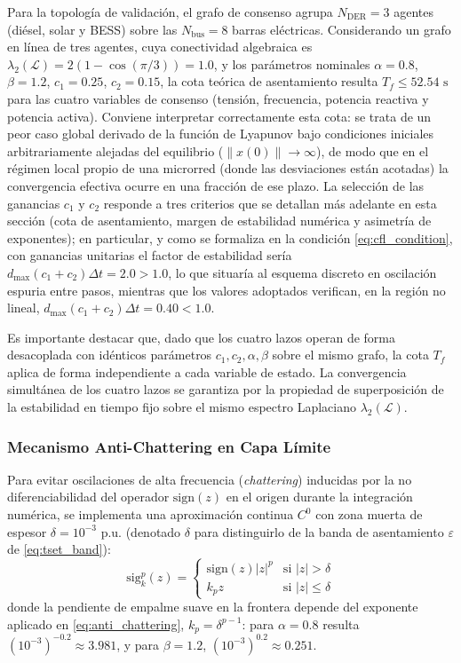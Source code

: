 Para la topología de validación, el grafo de consenso agrupa $N_{\text{DER}} = 3$ agentes (diésel, solar y BESS) sobre las $N_{\text{bus}} = 8$ barras eléctricas. Considerando un grafo en línea de tres agentes, cuya conectividad algebraica es $\lambda_2(\mathcal{L}) = 2(1-\cos(\pi/3)) = 1.0$, y los parámetros nominales $\alpha = 0.8$, $\beta = 1.2$, $c_1 = 0.25$, $c_2 = 0.15$, la cota teórica de asentamiento resulta $T_f \le 52.54\text{ s}$ para las cuatro variables de consenso (tensión, frecuencia, potencia reactiva y potencia activa). Conviene interpretar correctamente esta cota: se trata de un peor caso global derivado de la función de Lyapunov bajo condiciones iniciales arbitrariamente alejadas del equilibrio ($\|x(0)\| \to \infty$), de modo que en el régimen local propio de una microrred (donde las desviaciones están acotadas) la convergencia efectiva ocurre en una fracción de ese plazo. La selección de las ganancias $c_1$ y $c_2$ responde a tres criterios que se detallan más adelante en esta sección (cota de asentamiento, margen de estabilidad numérica y asimetría de exponentes); en particular, y como se formaliza en la condición \eqref{eq:cfl_condition}, con ganancias unitarias el factor de estabilidad sería $d_{\max}(c_1+c_2)\Delta t = 2.0 > 1.0$, lo que situaría al esquema discreto en oscilación espuria entre pasos, mientras que los valores adoptados verifican, en la región no lineal, $d_{\max}(c_1+c_2)\Delta t = 0.40 < 1.0$.

Es importante destacar que, dado que los cuatro lazos operan de forma desacoplada con idénticos parámetros $c_1, c_2, \alpha, \beta$ sobre el mismo grafo, la cota $T_f$ aplica de forma independiente a cada variable de estado. La convergencia simultánea de los cuatro lazos se garantiza por la propiedad de superposición de la estabilidad en tiempo fijo sobre el mismo espectro Laplaciano $\lambda_2(\mathcal{L})$.

\subsubsection{Mecanismo Anti-Chattering en Capa Límite}
Para evitar oscilaciones de alta frecuencia (\textit{chattering}) inducidas por la no diferenciabilidad del operador $\text{sign}(z)$ en el origen durante la integración numérica, se implementa una aproximación continua $C^0$ con zona muerta de espesor $\delta = 10^{-3}\text{ p.u.}$ (denotado $\delta$ para distinguirlo de la banda de asentamiento $\varepsilon$ de \eqref{eq:tset_band}):
\begin{equation}\label{eq:anti_chattering}
\text{sig}_k^p(z) = \begin{cases} \text{sign}(z)|z|^p & \text{si } |z| > \delta \\ k_p z & \text{si } |z| \le \delta \end{cases}
\end{equation}
donde la pendiente de empalme suave en la frontera depende del exponente aplicado en \eqref{eq:anti_chattering}, $k_p = \delta^{p-1}$: para $\alpha = 0.8$ resulta $(10^{-3})^{-0.2} \approx 3.981$, y para $\beta = 1.2$, $(10^{-3})^{0.2} \approx 0.251$.

